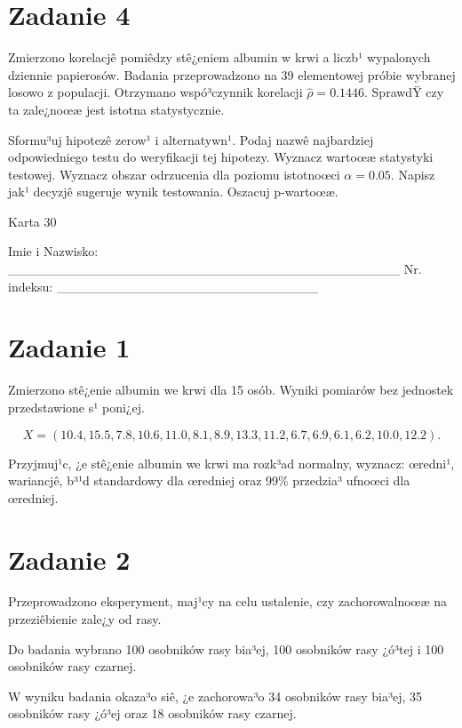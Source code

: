 \documentclass[a4paper,12pt]{article}
\begin{document}
  \section*{Zadanie 4}
     
     Zmierzono korelacjê pomiêdzy stê¿eniem albumin w krwi a liczb¹ wypalonych dziennie papierosów. 
     Badania przeprowadzono na 39 elementowej próbie wybranej losowo z populacji. 
     Otrzymano wspó³czynnik korelacji $\hat\rho = 0.1446 $. 
     SprawdŸ czy ta zale¿noœæ jest istotna statystycznie. 
     
     Sformu³uj hipotezê zerow¹ i alternatywn¹. 
     Podaj nazwê najbardziej odpowiedniego testu do weryfikacji tej hipotezy. 
     Wyznacz wartoœæ statystyki testowej. 
     Wyznacz obszar odrzucenia dla poziomu istotnoœci $\alpha=0.05$. 
     Napisz jak¹ decyzjê sugeruje wynik testowania. 
     Oszacuj p-wartoœæ. \vspace{1cm} 

  \clearpage  Karta  30  

 Imie i Nazwisko: \_\_\_\_\_\_\_\_\_\_\_\_\_\_\_\_\_\_\_\_\_\_\_\_\_\_\_\_\_\_\_\_\_\_\_\_\_\_\_\_\_\_ Nr. indeksu: \_\_\_\_\_\_\_\_\_\_\_\_\_\_\_\_\_\_\_\_\_\_\_\_\_\_\_\_ 
 \section*{Zadanie 1}
     
     Zmierzono stê¿enie albumin we krwi dla 15 osób. 
     Wyniki pomiarów bez jednostek przedstawione s¹ poni¿ej. 
     
     \noindent $$X=( 10.4, 15.5,  7.8, 10.6, 11.0,  8.1,  8.9, 13.3, 11.2,  6.7,  6.9,  6.1,  6.2, 10.0, 12.2 ).$$
     
     Przyjmuj¹c, ¿e stê¿enie albumin we krwi ma rozk³ad normalny, 
     wyznacz: œredni¹, wariancjê, b³¹d standardowy dla œredniej oraz 99\% przedzia³ ufnoœci dla œredniej. \vspace{1cm} 

  \section*{Zadanie 2}
     
  Przeprowadzono eksperyment, maj¹cy na celu ustalenie, czy zachorowalnoœæ na przeziêbienie zale¿y od rasy.
  
  Do badania wybrano 100 osobników rasy bia³ej, 100 osobników rasy ¿ó³tej i 100 osobników rasy czarnej. 
  
  W wyniku badania okaza³o siê, ¿e zachorowa³o 34 osobników rasy bia³ej, 35 osobników rasy ¿ó³ej oraz 18 osobników rasy czarnej. 
  
\end{document}
